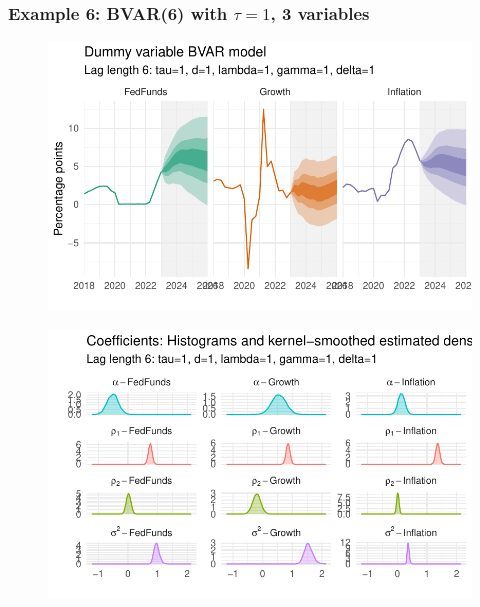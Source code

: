 \documentclass[
  letterpaper,
]{book}
\begin{document}
\hypertarget{example-6-bvar6-with-tau1-3-variables}{%
\subsubsection{\texorpdfstring{Example 6: BVAR(6) with \(\tau=1\), 3
variables}{Example 6: BVAR(6) with \textbackslash tau=1, 3 variables}}\label{example-6-bvar6-with-tau1-3-variables}}

\begin{figure}

{\centering \includegraphics{BVAR_files/figure-pdf/estim-1.pdf}

}

\end{figure}

\begin{figure}

{\centering \includegraphics{BVAR_files/figure-pdf/unnamed-chunk-14-1.pdf}

}

\end{figure}
\end{document}
